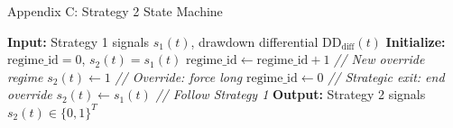 \documentclass[aspectratio=169,10pt]{beamer}
\begin{document}
\begin{frame}[fragile]{Appendix C: Strategy 2 State Machine}
\small
\begin{algorithmic}[1]
\STATE \textbf{Input:} Strategy 1 signals $s_1(t)$, drawdown differential $\text{DD}_{\text{diff}}(t)$
\STATE \textbf{Initialize:} $\text{regime\_id} = 0$, $s_2(t) = s_1(t)$
        \STATE $\text{regime\_id} \leftarrow \text{regime\_id} + 1$ \quad \textit{// New override regime}
    \ENDIF
        \STATE $s_2(t) \leftarrow 1$ \quad \textit{// Override: force long}
            \STATE $\text{regime\_id} \leftarrow 0$ \quad \textit{// Strategic exit: end override}
        \ENDIF
    \ELSE
        \STATE $s_2(t) \leftarrow s_1(t)$ \quad \textit{// Follow Strategy 1}
    \ENDIF
\ENDFOR
\STATE \textbf{Output:} Strategy 2 signals $s_2(t) \in \{0,1\}^T$
\end{algorithmic}
\end{frame}
\end{document}
